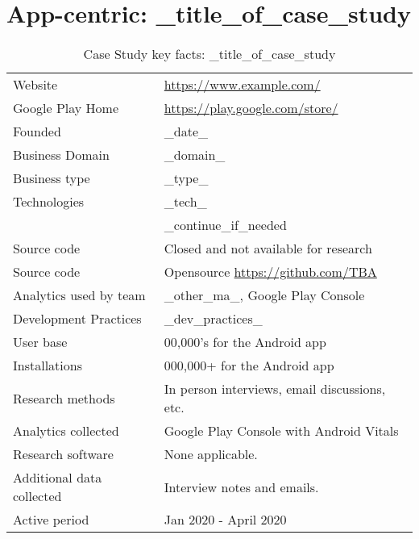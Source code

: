 \clearpage


\section{App-centric: _title_of_case_study} %

{\renewcommand{\arraystretch}{0.8}%
\begin{table}[htbp!]
    \centering
    \small
    \setlength{\tabcolsep}{1pt}
    \begin{tabular}{lp{9cm}}
       \toprule
       Website &\url{https://www.example.com/} \\
       Google Play Home & \url{https://play.google.com/store/} \\
       Founded & _date_ \\
       Business Domain & _domain_ \\
       Business type & _type_ \\
       Technologies  & _tech_ \\
       & _continue_if_needed \\
       Source code  &Closed and not available for research \\
       Source code  & Opensource \url{https://github.com/TBA} \\
       Analytics used by team & _other_ma_, Google Play Console \\
       Development Practices & _dev_practices_ \\
       \midrule
       User base & 00,000's for the Android app \\
       Installations & 000,000+ for the Android app \\
       \midrule
       Research methods &In person interviews, email discussions, etc. \\
       Analytics collected &Google Play Console with Android Vitals \\
       Research software & None applicable. \\
       Additional data collected &Interview notes and emails. \\
       Active period & Jan 2020 - April 2020 \\
       \bottomrule
    \end{tabular}
    \caption{Case Study key facts: _title_of_case_study}
    \label{tab:blank_case_study_anaytics_overview}
\end{table}
}

